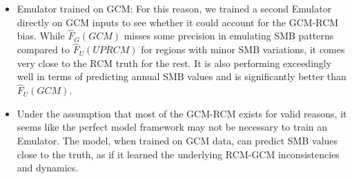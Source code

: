\documentclass[a4paper,11pt,oneside]{report}
\begin{document}
\begin{itemize}
     \item Emulator trained on GCM: For this reason, we trained a second Emulator directly on GCM inputs to see whether it could account for the GCM-RCM bias. While $\hat{F}_{G}(GCM)$ misses some precision in emulating SMB patterns compared to $\hat{F}_{U}(UPRCM)$ for regions with minor SMB variations, it comes very close to the RCM truth for the rest. It is also performing exceedingly well in terms of predicting annual SMB values and is significantly better than $\hat{F}_{U}(GCM)$. 
     \item Under the assumption that most of the GCM-RCM exists for valid reasons, it seems like the perfect model framework may not be necessary to train an Emulator. The model, when trained on GCM data, can predict SMB values close to the truth, as if it learned the underlying RCM-GCM inconsistencies and dynamics.   
\end{itemize}
\end{document}
